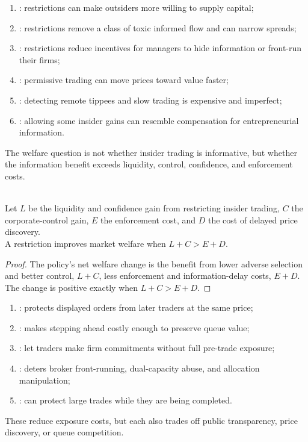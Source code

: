 \begin{taxonomy} 
\begin{enumerate}[label=\roman*.]
\setlength{\itemsep}{0pt}
\item {}: restrictions can make outsiders more willing to supply capital;
\item {}: restrictions remove a class of toxic informed flow and can narrow spreads;
\item {}: restrictions reduce incentives for managers to hide information or front-run their firms;
\item {}: permissive trading can move prices toward value faster;
\item {}: detecting remote tippees and slow trading is expensive and imperfect;
\item {}: allowing some insider gains can resemble compensation for entrepreneurial information.
\end{enumerate}
The welfare question is not whether insider trading is informative, but whether the information benefit exceeds liquidity, control, confidence, and enforcement costs.
\end{taxonomy}

\begin{proposition} \\
Let $L$ be the liquidity and confidence gain from restricting insider trading, $C$ the corporate-control gain, $E$ the enforcement cost, and $D$ the cost of delayed price discovery.\\
A restriction improves market welfare when $L+C>E+D$.
\begin{proof}
The policy's net welfare change is the benefit from lower adverse selection and better control, $L+C$, less enforcement and information-delay costs, $E+D$.\\
The change is positive exactly when $L+C>E+D$.
\end{proof}
\end{proposition}

\begin{taxonomy} 
\begin{enumerate}[label=\roman*.]
\setlength{\itemsep}{0pt}
\item {}: protects displayed orders from later traders at the same price;
\item {}: makes stepping ahead costly enough to preserve queue value;
\item {}: let traders make firm commitments without full pre-trade exposure;
\item {}: deters broker front-running, dual-capacity abuse, and allocation manipulation;
\item {}: can protect large trades while they are being completed.
\end{enumerate}
These reduce exposure costs, but each also trades off public transparency, price discovery, or queue competition.
\end{taxonomy}

